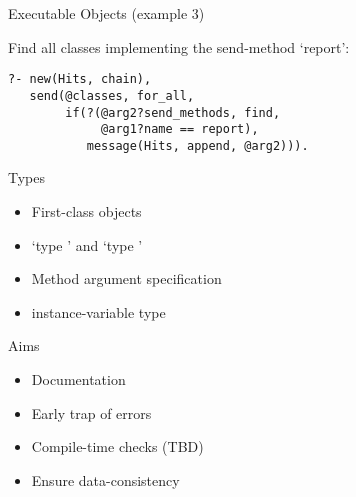 \begin{sli}{Executable Objects (example 3)}

Find all classes implementing the send-method `report':

\begin{verbatim}
?- new(Hits, chain),
   send(@classes, for_all,
        if(?(@arg2?send_methods, find,
             @arg1?name == report),
           message(Hits, append, @arg2))).
\end{verbatim}

\noindent
\end{sli}


\begin{sli}{Types}

\begin{itemize}
    \item First-class objects
    \item {}`type ' and `type '
    \item Method argument specification
    \item instance-variable type
\end{itemize}

Aims

\begin{itemize}
    \item Documentation
    \item Early trap of errors
    \item Compile-time checks (TBD)
    \item Ensure data-consistency
\end{itemize}
\end{sli}

